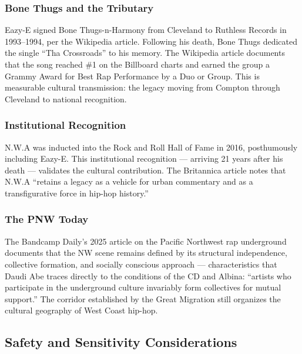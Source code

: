 \documentclass[11pt,letterpaper]{article}
\begin{document}
\subsubsection{Bone Thugs and the Tributary}

Eazy-E signed Bone Thugs-n-Harmony from Cleveland to Ruthless Records in 1993--1994, per the Wikipedia article. Following his death, Bone Thugs dedicated the single ``Tha Crossroads'' to his memory. The Wikipedia article documents that the song reached \#1 on the Billboard charts and earned the group a Grammy Award for Best Rap Performance by a Duo or Group. This is measurable cultural transmission: the legacy moving from Compton through Cleveland to national recognition.

\subsubsection{Institutional Recognition}

N.W.A was inducted into the Rock and Roll Hall of Fame in 2016, posthumously including Eazy-E. This institutional recognition --- arriving 21 years after his death --- validates the cultural contribution. The Britannica article notes that N.W.A ``retains a legacy as a vehicle for urban commentary and as a transfigurative force in hip-hop history.''

\subsubsection{The PNW Today}

The Bandcamp Daily's 2025 article on the Pacific Northwest rap underground documents that the NW scene remains defined by its structural independence, collective formation, and socially conscious approach --- characteristics that Daudi Abe traces directly to the conditions of the CD and Albina: ``artists who participate in the underground culture invariably form collectives for mutual support.'' The corridor established by the Great Migration still organizes the cultural geography of West Coast hip-hop.

\subsection{Safety and Sensitivity Considerations}
\end{document}
